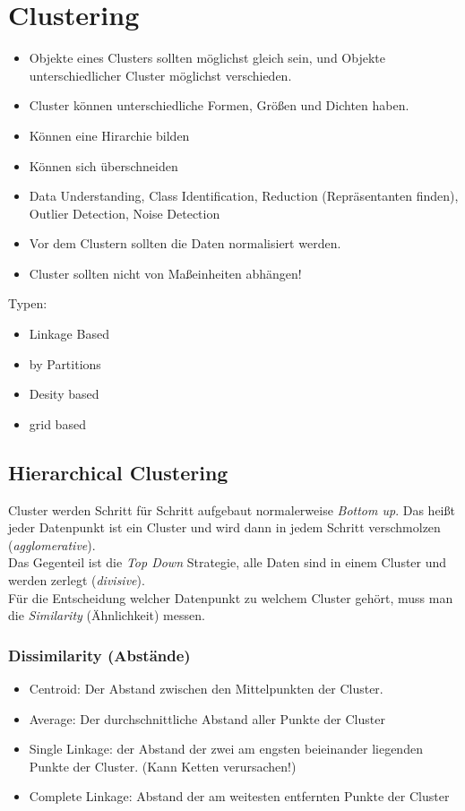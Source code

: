 \documentclass[a4paper]{scrartcl}
\begin{document}
\section{Clustering}
\begin{itemize}
\setlength{\parskip}{-1pt}
\item Objekte eines Clusters sollten möglichst gleich sein, und Objekte unterschiedlicher Cluster möglichst verschieden.
\item Cluster können unterschiedliche Formen, Größen und Dichten haben.
\item Können eine Hirarchie bilden
\item Können sich überschneiden
\item Data Understanding, Class Identification, Reduction (Repräsentanten finden), Outlier Detection, Noise Detection
\item Vor dem Clustern sollten die Daten normalisiert werden.
\item Cluster sollten nicht von Maßeinheiten abhängen!
\end{itemize}
Typen:
\begin{itemize}
\setlength{\parskip}{-1pt}
\item Linkage Based
\item by Partitions
\item Desity based
\item grid based
\end{itemize}

\subsection{Hierarchical Clustering}
Cluster werden Schritt für Schritt aufgebaut normalerweise \textit{Bottom up}. Das heißt jeder Datenpunkt ist ein Cluster und wird dann in jedem Schritt verschmolzen (\textit{agglomerative}).\\
Das Gegenteil ist die \textit{Top Down} Strategie, alle Daten sind in einem Cluster und werden zerlegt (\textit{divisive}).\\
Für die Entscheidung welcher Datenpunkt zu welchem Cluster gehört, muss man die \textit{Similarity} (Ähnlichkeit) messen.\\

\subsubsection{Dissimilarity (Abstände)}
\begin{itemize}
\item Centroid: Der Abstand zwischen den Mittelpunkten der Cluster.
\item Average: Der durchschnittliche Abstand aller Punkte der Cluster
\item Single Linkage: der Abstand der zwei am engsten beieinander liegenden Punkte der Cluster. (Kann Ketten verursachen!)
\item Complete Linkage: Abstand der am weitesten entfernten Punkte der Cluster
\end{itemize}
\end{document}
